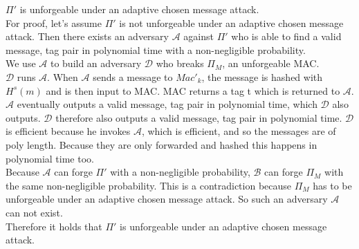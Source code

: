 $\Pi'$ is unforgeable under an adaptive chosen message attack.\\
For proof, let's assume $\Pi'$ is not unforgeable under an adaptive chosen message attack.
Then there exists an adversary $\mathcal{A}$ against $\Pi'$ who is able to find a valid message, tag pair in polynomial time with a non-negligible probability.\\
We use $\mathcal{A}$ to build an adversary $\mathcal{D}$ who breaks $\Pi_{M}$, an unforgeable MAC.\\
$\mathcal{D}$ runs $\mathcal{A}$. When $\mathcal{A}$ sends a message to $Mac'_{k}$, the message is hashed with $H^{s}(m)$ and is then input to MAC. MAC returns a tag t which is returned to  $\mathcal{A}$.\\
$\mathcal{A}$ eventually outputs a valid message, tag pair in polynomial time, which $\mathcal{D}$ also outputs.
$\mathcal{D}$ therefore also outputs a valid message, tag pair in polynomial time.
$\mathcal{D}$ is efficient because he invokes $\mathcal{A}$, which is efficient, and so the messages are of poly length. Because they are only forwarded and hashed this happens in polynomial time too.\\
Because $\mathcal{A}$ can forge \(\Pi'\) with a non-negligible probability, $\mathcal{B}$ can forge \(\Pi_M\) with the same non-negligible probability. This is a contradiction because \(\Pi_M\) has to be unforgeable under an adaptive chosen message attack. So such an adversary $\mathcal{A}$ can not exist.\\
Therefore it holds that $\Pi'$ is unforgeable under an adaptive chosen message attack.

